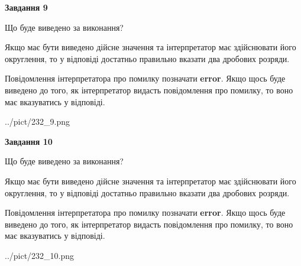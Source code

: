 \documentclass[12pt, ukrainian]{article}
\begin{document}
{\begin {Large}
{\begin {center}\textbf{Завдання 9}\end {center}}\par
Що буде виведено за виконання? \par

Якщо має бути виведено дійсне значення та інтерпретатор має здійснювати його округлення, 
то у відповіді достатньо правильно вказати два дробових розряди.

Повідомлення інтерпретатора про помилку позначати \textbf{error}.
Якщо щось буде виведено до того, як інтерпретатор видасть повідомлення про помилку, 
то воно має вказуватись у відповіді. \par

\begin{center}
	{../pict/232_9.png}
\end{center}
\newpage

{\begin {center}\textbf{Завдання 10}\end {center}}\par
Що буде виведено за виконання? \par

Якщо має бути виведено дійсне значення та інтерпретатор має здійснювати його округлення, 
то у відповіді достатньо правильно вказати два дробових розряди.

Повідомлення інтерпретатора про помилку позначати \textbf{error}.
Якщо щось буде виведено до того, як інтерпретатор видасть повідомлення про помилку, 
то воно має вказуватись у відповіді. \par

\begin{center}
	{../pict/232_10.png}
\end{center}
\newpage

\end {Large}}
\end{document}
